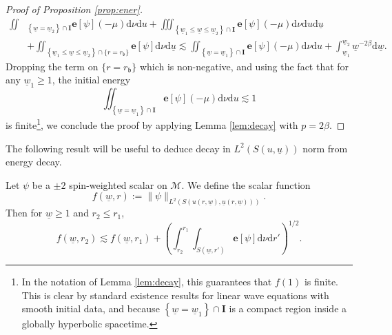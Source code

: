 \documentclass[reqno]{amsart}
\numberwithin{equation}{section}
\newcommand{\mcm}{\mathcal{M}}
\newcommand{\wbar}{\underline{w}}
\newcommand{\ubar}{{\underline{u}}}
\newcommand{\dee}{\mathrm{d}}
\newcommand{\ener}{\mathbf{e}}
\newcommand{\rb}{r_\mathfrak{b}}
\theoremstyle{plain}
\theoremstyle{definition}
\theoremstyle{remark}
\numberwithin{equation}{section}
\begin{document}
\begin{proof}[Proof of Proposition \ref{prop:ener}]
\begin{align}
 \iint&_{\left\{\underline{w}=\underline{w}_2\right\} \cap \mathbf{I}} \mathbf{e}[\psi](-\mu) \dee\nu \mathrm{d} u+\iiint_{\left\{\underline{w}_1 \leq \underline{w} \leq \underline{w}_2\right\} \cap \mathbf{I}} \mathbf{e}[\psi](-\mu) \dee\nu \mathrm{d} u \mathrm{d} \underline{u} \label{eqn:pourapres} \\
&+\iint_{\left\{\underline{w}_1 \leq \underline{w} \leq \underline{w}_2\right\} \cap \{r=\rb\}} \mathbf{e}[\psi]\dee\nu\mathrm{d} \underline{u} \lesssim \iint_{\left\{\underline{w}=\underline{w}_1\right\} \cap \mathbf{I}} \mathbf{e}[\psi](-\mu) \dee\nu \mathrm{d} u+\int_{\underline{w}_1}^{\underline{w}_2} \underline{w}^{-2\beta} \mathrm{d} \underline{w}.\nonumber
\end{align}
{Dropping the term on $\{r=\rb\}$ which is non-negative, and using the fact that for any $\wbar_1\geq 1$, the initial energy 
$$\iint_{\left\{\underline{w}=\underline{w}_1\right\} \cap \mathbf{I}} \mathbf{e}[\psi](-\mu) \dee\nu \mathrm{d} u\lesssim 1$$
is finite\footnote{In the notation of Lemma \ref{lem:decay}, this guarantees that $f(1)$ is finite. This is clear by standard existence results for linear wave equations with smooth initial data, and because $\left\{\underline{w}=\underline{w}_1\right\} \cap \mathbf{I}$ is a compact region inside a globally hyperbolic spacetime.}, we conclude the proof by applying Lemma \ref{lem:decay} with $p=2\beta$.}
\end{proof}
The following result will be useful to deduce decay in $L^2(S(u,\ubar))$ norm from energy decay.
\begin{lem}\label{lem:integ}
    Let $\psi$ be a $\pm 2$ spin-weighted scalar on $\mcm$. We define the scalar function $$f(\wbar,r):=\|\psi\|_{L^2(S(u(r,\wbar),\ubar(r,\wbar)))}.$$
    Then for $\wbar\geq 1$ and $r_2\leq r_1$,
    $$f(\wbar,r_2)\lesssim f(\wbar,r_1)+\left(\int_{r_2}^{r_1}\int_{S(\wbar,r')}\ener[\psi]\dee\nu\dee r'\right)^{1/2}.$$
\end{lem}
\end{document}
